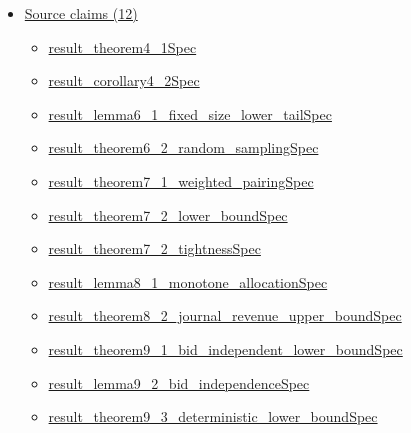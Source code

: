 \documentclass[10pt]{article}
\begin{document}
\begin{itemize}[leftmargin=1.2em]
\begin{itemize}[leftmargin=1.2em]
\end{itemize}
\item \hyperlink{source-section-f10b5f68e4acf3dc}{Source claims (12)}
\begin{itemize}[leftmargin=1.2em]
\item \hyperlink{source-claim-2bea065aff29fbec}{result\_\allowbreak{}theorem4\_\allowbreak{}1\allowbreak{}Spec}
\item \hyperlink{source-claim-c584c5cb21438e15}{result\_\allowbreak{}corollary4\_\allowbreak{}2\allowbreak{}Spec}
\item \hyperlink{source-claim-de03b129c03015d1}{result\_\allowbreak{}lemma6\_\allowbreak{}1\_\allowbreak{}fixed\_\allowbreak{}size\_\allowbreak{}lower\_\allowbreak{}tail\allowbreak{}Spec}
\item \hyperlink{source-claim-dbcf1d32b28d9965}{result\_\allowbreak{}theorem6\_\allowbreak{}2\_\allowbreak{}random\_\allowbreak{}sampling\allowbreak{}Spec}
\item \hyperlink{source-claim-f07b3322ac4a8773}{result\_\allowbreak{}theorem7\_\allowbreak{}1\_\allowbreak{}weighted\_\allowbreak{}pairing\allowbreak{}Spec}
\item \hyperlink{source-claim-d2203fdcdcb5c29a}{result\_\allowbreak{}theorem7\_\allowbreak{}2\_\allowbreak{}lower\_\allowbreak{}bound\allowbreak{}Spec}
\item \hyperlink{source-claim-9c375a1b7af827ba}{result\_\allowbreak{}theorem7\_\allowbreak{}2\_\allowbreak{}tightness\allowbreak{}Spec}
\item \hyperlink{source-claim-16eee1e38ed670e7}{result\_\allowbreak{}lemma8\_\allowbreak{}1\_\allowbreak{}monotone\_\allowbreak{}allocation\allowbreak{}Spec}
\item \hyperlink{source-claim-e7742b37ea94b834}{result\_\allowbreak{}theorem8\_\allowbreak{}2\_\allowbreak{}journal\_\allowbreak{}revenue\_\allowbreak{}upper\_\allowbreak{}bound\allowbreak{}Spec}
\item \hyperlink{source-claim-2aeebcaf889368d8}{result\_\allowbreak{}theorem9\_\allowbreak{}1\_\allowbreak{}bid\_\allowbreak{}independent\_\allowbreak{}lower\_\allowbreak{}bound\allowbreak{}Spec}
\item \hyperlink{source-claim-60df12d3b02570ba}{result\_\allowbreak{}lemma9\_\allowbreak{}2\_\allowbreak{}bid\_\allowbreak{}independence\allowbreak{}Spec}
\item \hyperlink{source-claim-6ef8d3c17f2b5df3}{result\_\allowbreak{}theorem9\_\allowbreak{}3\_\allowbreak{}deterministic\_\allowbreak{}lower\_\allowbreak{}bound\allowbreak{}Spec}
\end{itemize}
\end{itemize}
\end{document}
